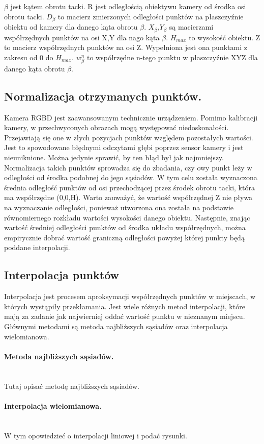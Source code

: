 $\beta$ jest kątem obrotu tacki. R jest odległością obiektywu kamery od środka osi obrotu tacki. $D_{\beta}$ to macierz zmierzonych odległości punktów na płaszczyźnie obiektu od kamery dla danego kąta obrotu $\beta$. $X_{\beta}$,$Y_{\beta}$ są macierzami współrzędnych punktów na osi X,Y dla nago kąta $\beta$. $H_{max}$ to wysokość obiektu. Z to macierz współrzędnych punktów na osi Z. Wypełniona jest ona punktami z zakresu od 0 do $H_{max}$. $w_{\beta}^n$ to współrzędne n-tego punktu w płaszczyźnie XYZ dla danego kąta obrotu $\beta$.

\subsection{Normalizacja otrzymanych punktów.}
Kamera RGBD jest zaawansowanym technicznie urządzeniem. Pomimo kalibracji kamery, w przechwyconych obrazach mogą występować niedoskonałości. Przejawiają się one w złych pozycjach punktów względem pozostałych wartości. Jest to spowodowane błędnymi odczytami głębi poprzez sensor kamery i jest nieuniknione. Można jedynie sprawić, by ten błąd był jak najmniejszy. Normalizacja takich punktów sprowadza się do zbadania, czy owy punkt leży w odległości od środka podobnej do jego sąsiadów. W tym celu została wyznaczona średnia odległość punktów od osi przechodzącej przez środek obrotu tacki, która ma współrzędne (0,0,H). Warto zauważyć, że wartość współrzędnej Z nie pływa na wyznaczanie odległości, ponieważ utworzona ona została na podstawie równomiernego rozkładu wartości wysokości danego obiektu. Następnie, znając wartość średniej odległości punktów od środka układu współrzędnych, można empirycznie dobrać wartość graniczną odległości powyżej której punkty będą poddane interpolacji.

\subsection{Interpolacja punktów}
Interpolacja jest procesem aproksymacji współrzędnych punktów w miejscach, w których wystąpiły przekłamania. Jest wiele różnych metod interpolacji, które mają za zadanie jak najwierniej oddać wartość punktu w nieznanym miejscu. Głównymi metodami są metoda najbliższych sąsiadów oraz interpolacja wielomianowa.

\paragraph{Metoda najbliższych sąsiadów.\newline}\\

Tutaj opisać metodę najbliższych sąsiadów.
\paragraph{Interpolacja wielomianowa.\newline}\\
W tym opowiedzieć o interpolacji liniowej i podać rysunki.

